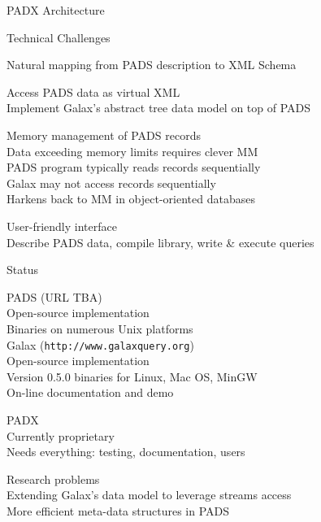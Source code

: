\documentclass[landscape]{slides}
\begin{document}
\begin{Slide}{PADX Architecture} 

\vspace{2cm}
\centerline{{}}

\end{Slide}

\begin{Slide}{Technical Challenges}

  \bb Natural mapping from PADS description to XML Schema 

  \bb Access PADS data as virtual XML \\
  \bbb Implement Galax's abstract tree data model on top of PADS 

  \bb Memory management of PADS records \\
  \bbb Data exceeding memory limits requires clever MM\\
  \bbb PADS program typically reads records sequentially \\
  \bbb Galax may not access records sequentially \\
  \bbb Harkens back to MM in object-oriented databases

  \bb User-friendly interface\\
  \bbb Describe PADS data, compile library, write \& execute queries
\end{Slide}

\begin{Slide}{Status}

  \bb PADS (URL TBA)\\
  \bbb Open-source implementation \\
  \bbb Binaries on numerous Unix platforms\\

  \bb Galax (\texttt{http://www.galaxquery.org})\\
  \bbb Open-source implementation \\
  \bbb Version 0.5.0 binaries for Linux, Mac OS, MinGW\\
  \bbb On-line documentation and demo

  \bb PADX\\
  \bbb Currently proprietary\\
  \bbb Needs everything: testing, documentation, users

  \bb Research problems\\
  \bbb Extending Galax's data model to leverage streams access\\
  \bbb More efficient meta-data structures in PADS 
\end{Slide}
\end{document}
